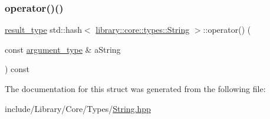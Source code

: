 \subsubsection{\texorpdfstring{operator()()}{operator()()}}
{\footnotesize\ttfamily \hyperlink{structstd_1_1hash_3_01library_1_1core_1_1types_1_1String_01_4_a7c325dc55fee13f3b845ef9c8946a597}{result\+\_\+type} std\+::hash$<$ \hyperlink{classlibrary_1_1core_1_1types_1_1String}{library\+::core\+::types\+::\+String} $>$\+::operator() (\begin{DoxyParamCaption}\item[{const \hyperlink{structstd_1_1hash_3_01library_1_1core_1_1types_1_1String_01_4_a02e9e2783fae71235bd5239d3b8cab75}{argument\+\_\+type} \&}]{a\+String }\end{DoxyParamCaption}) const\hspace{0.3cm}{\ttfamily [inline]}}



The documentation for this struct was generated from the following file\+:\begin{DoxyCompactItemize}
\item 
include/\+Library/\+Core/\+Types/\hyperlink{String_8hpp}{String.\+hpp}\end{DoxyCompactItemize}
